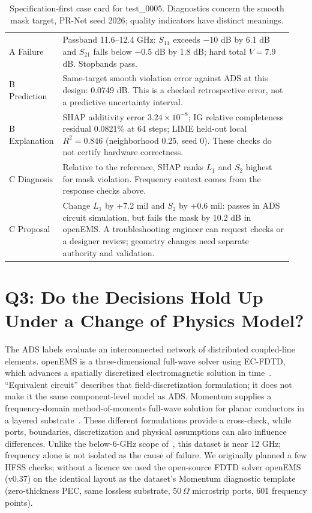 \documentclass[conference,10pt]{IEEEtran}
\begin{document}
\begin{table}[!t]
\centering
\caption{Specification-first case card for test\_0005. Diagnostics concern the smooth mask target, PR-Net seed 2026; quality indicators have distinct meanings.}
\label{tab:card}
\small
\begin{tabular}{p{0.14\linewidth}p{0.80\linewidth}}
\toprule
A Failure & Passband 11.6--12.4 GHz: $S_{11}$ exceeds $-10$ dB by 6.1 dB and $S_{21}$ falls below $-0.5$ dB by 1.8 dB; hard total $V=7.9$ dB. Stopbands pass. \\
B Prediction & Same-target smooth violation error against ADS at this design: 0.0749 dB. This is a checked retrospective error, not a predictive uncertainty interval. \\
B Explanation & SHAP additivity error $3.24\times10^{-8}$; IG relative completeness residual 0.0821\% at 64 steps; LIME held-out local $R^2=0.846$ (neighborhood 0.25, seed 0). These checks do not certify hardware correctness. \\
C Diagnosis & Relative to the reference, SHAP ranks $L_1$ and $S_2$ highest for mask violation. Frequency context comes from the response checks above. \\
C Proposal & Change $L_1$ by +7.2 mil and $S_2$ by +0.6 mil: passes in ADS circuit simulation, but fails the mask by 10.2 dB in openEMS. A troubleshooting engineer can request checks or a designer review; geometry changes need separate authority and validation. \\
\bottomrule
\end{tabular}
\end{table}

\section{Q3: Do the Decisions Hold Up Under a Change of Physics Model?}
\label{sec:q3}
The ADS labels evaluate an interconnected network of distributed coupled-line elements. openEMS is a three-dimensional full-wave solver using EC-FDTD, which advances a spatially discretized electromagnetic solution in time~\cite{openems_docs}. ``Equivalent circuit'' describes that field-discretization formulation; it does not make it the same component-level model as ADS. Momentum supplies a frequency-domain method-of-moments full-wave solution for planar conductors in a layered substrate~\cite{keysight_momentum}. These different formulations provide a cross-check, while ports, boundaries, discretization and physical assumptions can also influence differences. Unlike the below-6-GHz scope of~\cite{suslova2026}, this dataset is near 12 GHz; frequency alone is not isolated as the cause of failure.
We originally planned a few HFSS checks; without a licence we used the open-source FDTD solver openEMS~\cite{liebig2013} (v0.37) on the identical layout as the dataset's Momentum diagnostic template (zero-thickness PEC, same lossless substrate, 50\,$\Omega$ microstrip ports, 601 frequency points).
\end{document}
